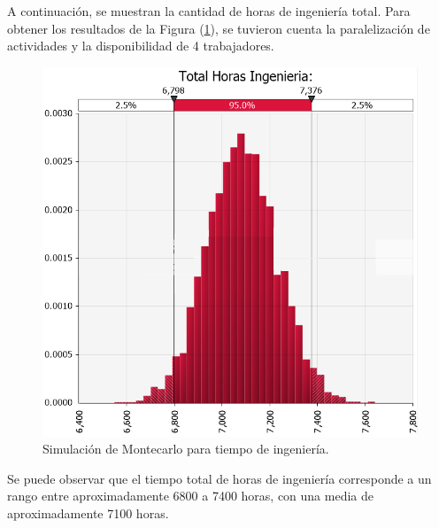 A continuación, se muestran la cantidad de horas de ingeniería total. Para obtener los resultados de la Figura (\ref{fig:montecarlo_tiempos_ing}), se tuvieron cuenta la paralelización de actividades y la disponibilidad de 4 trabajadores.
\begin{figure}[H]
	\centering
	\includegraphics[width=0.5\linewidth]{ImagenesFactibilidad/montecarlo_tiempo_largo}	
	\caption{Simulación de Montecarlo para tiempo de ingeniería.}
	\label{fig:montecarlo_tiempos_ing}
\end{figure}

Se puede observar que el tiempo total de horas de ingeniería corresponde a un rango entre aproximadamente 6800 a 7400 horas, con una media de aproximadamente 7100 horas.